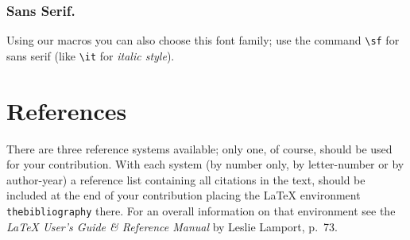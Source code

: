 \subsubsection*{Sans Serif.}
%
Using our macros you can also choose this font family;
use the command \verb|\sf| for {\sf sans serif}
(like \verb|\it| for {\it italic style}).
%
\section{References}
\label{refer}
%
There are three reference systems available; only one, of course,
should be used for your contribution. With each system (by
number only, by letter-number or by author-year) a reference list
containing all citations in the
text, should be included at the end of your contribution placing the
\LaTeX{} environment \verb|thebibliography| there.
For an overall information on that environment
see the {\em \LaTeX{} User's Guide \& Reference
Manual\/} by Leslie Lamport, p.~73.
%
